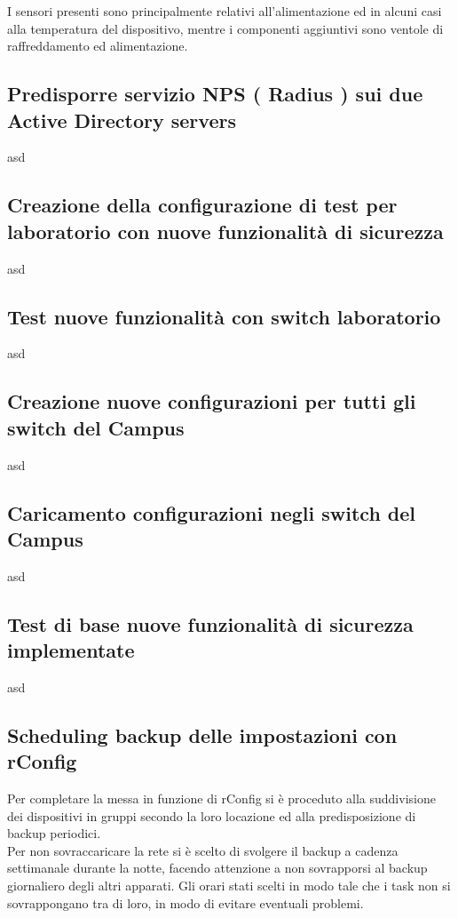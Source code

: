 \documentclass[Realizzazione.tex]{subfiles}
\begin{document}
I sensori presenti sono principalmente relativi all'alimentazione ed in alcuni casi alla temperatura del dispositivo, mentre i componenti aggiuntivi sono ventole di raffreddamento ed alimentazione. \\

\subsection{Predisporre servizio NPS ( Radius ) sui due Active Directory servers} 
asd
\subsection{Creazione della configurazione di test per laboratorio con nuove funzionalità di sicurezza} 
asd
\subsection{Test nuove funzionalità con switch laboratorio} 
asd
\subsection{Creazione nuove configurazioni per tutti gli switch del Campus} 
asd
\subsection{Caricamento configurazioni negli switch del Campus} 
asd
\subsection{Test di base nuove funzionalità di sicurezza implementate} 
asd

\subsection{Scheduling backup delle impostazioni con rConfig}

Per completare la messa in funzione di rConfig si è proceduto alla suddivisione dei dispositivi in gruppi secondo la loro locazione ed alla predisposizione di backup periodici. \\
Per non sovraccaricare la rete si è scelto di svolgere il backup a cadenza settimanale durante la notte, facendo attenzione a non sovrapporsi al backup giornaliero degli altri apparati. Gli orari stati scelti in modo tale che i task non si sovrappongano tra di loro, in modo di evitare eventuali problemi.\\
\end{document}
